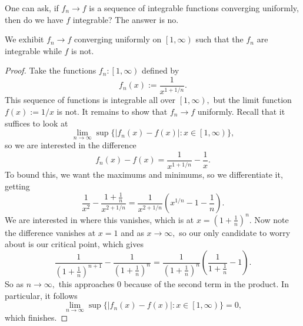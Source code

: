 One can ask, if $f_n\to f$ is a sequence of integrable functions converging uniformly, then do we have $f$ integrable? The answer is no.
\begin{exercise}
	We exhibit $f_n\to f$ converging uniformly on $\left[1,\infty\right)$ such that the $f_n$ are integrable while $f$ is not.
\end{exercise}
\begin{proof}
	Take the functions $f_n:\left[1,\infty\right)$ defined by
	\[f_n(x):=\frac1{x^{1+1/n}}.\]
	This sequence of functions is integrable all over $\left[1,\infty\right),$ but the limit function $f(x):=1/x$ is not. It remains to show that $f_n\to f$ uniformly. Recall that it suffices to look at
	\[\lim_{n\to\infty}\sup\{|f_n(x)-f(x)|:x\in\left[1,\infty\right)\},\]
	so we are interested in the difference
	\[f_n(x)-f(x)=\frac1{x^{1+1/n}}-\frac1x.\]
	To bound this, we want the maximums and minimums, so we differentiate it, getting
	\[\frac1{x^2}-\frac{1+\frac1n}{x^{2+1/n}}=\frac1{x^{2+1/n}}\left(x^{1/n}-1-\frac1n\right).\]
	We are interested in where this vanishes, which is at $x=\left(1+\frac1n\right)^n.$ Now note the difference vanishes at $x=1$ and as $x\to\infty,$ so our only candidate to worry about is our critical point, which gives
	\[\frac1{\left(1+\frac1n\right)^{n+1}}-\frac1{\left(1+\frac1n\right)^n}=\frac1{\left(1+\frac1n\right)^n}\left(\frac1{1+\frac1n}-1\right).\]
	So as $n\to\infty,$ this approaches $0$ because of the second term in the product. In particular, it follows
	\[\lim_{n\to\infty}\sup\{|f_n(x)-f(x)|:x\in\left[1,\infty\right)\}=0,\]
	which finishes.
\end{proof}
